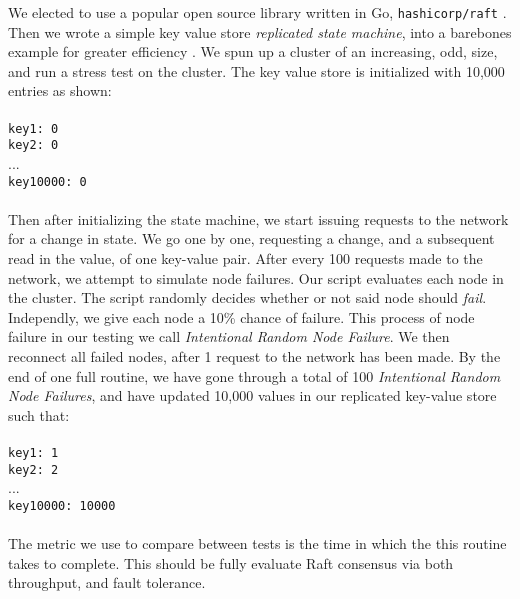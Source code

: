 	We elected to use a popular open source library written in Go, \texttt{hashicorp/raft} \cite{HashicorpRaft}. Then we wrote a simple key value store \textit{replicated state machine}, into a barebones example for greater efficiency \cite{Dinghy}. We spun up a cluster of an increasing, odd, size, and run a stress test on the cluster. The key value store is initialized with 10,000 entries as shown:
	\\
	\\
	\texttt{key1: 0}
	\\
	\texttt{key2: 0}
	\\
	...
	\\
	\texttt{key10000: 0}
	\\
	\\
	Then after initializing the state machine, we start issuing requests to the network for a change in state. We go one by one, requesting a change, and a subsequent read in the value, of one key-value pair. After every 100 requests made to the network, we attempt to simulate node failures. Our script evaluates each node in the cluster. The script randomly decides whether or not said node should \textit{fail}. Independly, we give each node a 10\% chance of failure. This process of node failure in our testing we call \textit{Intentional Random Node Failure}. We then reconnect all failed nodes, after 1 request to the network has been made. By the end of one full routine, we have gone through a total of 100 \textit{Intentional Random Node Failures}, and have updated 10,000 values in our replicated key-value store such that:
	\\
	 \\
	\texttt{key1: 1}
	\\
	\texttt{key2: 2}
	\\
	...
	\\
	\texttt{key10000: 10000}
	\\
	 \\
	The metric we use to compare between tests is the time in which the this routine takes to complete. This should be fully evaluate Raft consensus via both throughput, and fault tolerance.